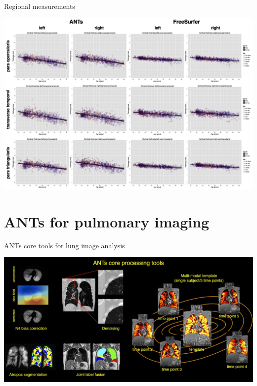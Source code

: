 \documentclass[ignorenonframetext,]{beamer}
\begin{document}
\begin{frame}{Regional measurements}

\includegraphics{./evaluation/figures/antsvfreesurfer_regionalPlots.png}

\end{frame}

\section{ANTs for pulmonary imaging}\label{ants-for-pulmonary-imaging}

\begin{frame}{ANTs core tools for lung image analysis}

\includegraphics{./lung/figures/coreANtsToolsLung.png}

\end{frame}
\end{document}
